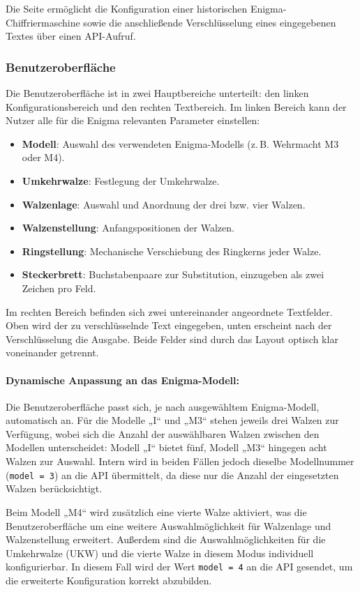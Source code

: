 \documentclass[12pt, ngerman, a4paper, numbers=noenddot]{article}
\begin{document}
Die Seite ermöglicht die Konfiguration einer historischen Enigma-Chiffrier\-maschine sowie die anschließende Verschlüsselung eines eingegebenen Textes über einen API-Aufruf.

\subsubsection{Benutzeroberfläche}

Die Benutzeroberfläche ist in zwei Hauptbereiche unterteilt: den linken Konfigurationsbereich und den rechten Textbereich. Im linken Bereich kann der Nutzer alle für die Enigma relevanten Parameter einstellen:

\begin{itemize}
	\item \textbf{Modell}: Auswahl des verwendeten Enigma-Modells (z.\,B. Wehrmacht M3 oder M4).
	\item \textbf{Umkehrwalze}: Festlegung der Umkehrwalze.
	\item \textbf{Walzenlage}: Auswahl und Anordnung der drei bzw. vier Walzen.
	\item \textbf{Walzenstellung}: Anfangspositionen der Walzen.
	\item \textbf{Ringstellung}: Mechanische Verschiebung des Ringkerns jeder Walze.
	\item \textbf{Steckerbrett}: Buchstabenpaare zur Substitution, einzugeben als zwei Zeichen pro Feld.
\end{itemize}

Im rechten Bereich befinden sich zwei untereinander angeordnete Textfelder. Oben wird der zu verschlüsselnde Text eingegeben, unten erscheint nach der Verschlüsselung die Ausgabe. Beide Felder sind durch das Layout optisch klar voneinander getrennt.

\paragraph{Dynamische Anpassung an das Enigma-Modell:}
Die Benutzeroberfläche passt sich, je nach ausgewähltem Enigma-Modell, automatisch an. Für die Modelle „I“ und „M3“ stehen jeweils drei Walzen zur Verfügung, wobei sich die Anzahl der auswählbaren Walzen zwischen den Modellen unterscheidet: Modell „I“ bietet fünf, Modell „M3“ hingegen acht Walzen zur Auswahl. Intern wird in beiden Fällen jedoch dieselbe Modellnummer (\lstinline|model = 3|) an die API übermittelt, da diese nur die Anzahl der eingesetzten Walzen berücksichtigt.

Beim Modell „M4“ wird zusätzlich eine vierte Walze aktiviert, was die Benutzeroberfläche um eine weitere Auswahlmöglichkeit für Walzenlage und Walzenstellung erweitert. Außerdem sind die Auswahlmöglichkeiten für die Umkehrwalze (UKW) und die vierte Walze in diesem Modus individuell konfigurierbar. In diesem Fall wird der Wert \lstinline|model = 4| an die API gesendet, um die erweiterte Konfiguration korrekt abzubilden.
\end{document}
